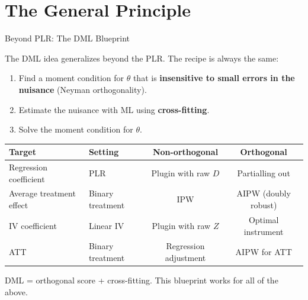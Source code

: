 \documentclass[aspectratio=169, 11pt, handout]{beamer}
\begin{document}
\section{The General Principle}

\begin{frame}{Beyond PLR: The DML Blueprint}

The DML idea generalizes beyond the PLR. The recipe is always the same:

\bigskip

\begin{enumerate}
    \item Find a moment condition for $\theta$ that is \textbf{insensitive to small errors in the nuisance} (Neyman orthogonality).
    \item Estimate the nuisance with ML using \textbf{cross-fitting}.
    \item Solve the moment condition for $\theta$.
\end{enumerate}

\bigskip
\pause

\begin{center}
\scriptsize
\begin{tabular}{llcc}
\toprule
\textbf{Target} & \textbf{Setting} & \textbf{Non-orthogonal} & \textbf{Orthogonal} \\
\midrule
Regression coefficient & PLR & Plugin with raw $D$ & Partialling out \\
Average treatment effect & Binary treatment & IPW & AIPW (doubly robust) \\
IV coefficient & Linear IV & Plugin with raw $Z$ & Optimal instrument \\
ATT & Binary treatment & Regression adjustment & AIPW for ATT \\
\bottomrule
\end{tabular}
\end{center}

\bigskip

DML = orthogonal score + cross-fitting. This blueprint works for all of the above.

\end{frame}


\end{document}
